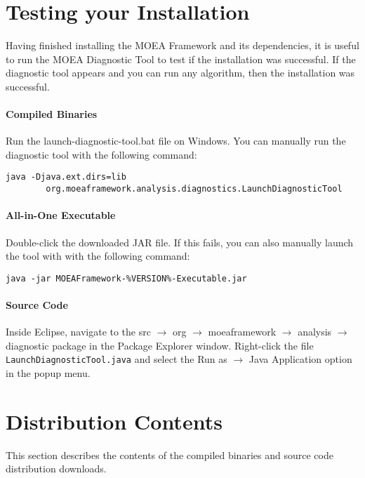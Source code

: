 \section{Testing your Installation}
Having finished installing the MOEA Framework and its dependencies, it is useful to run the MOEA Diagnostic Tool to test if the installation was successful.  If the diagnostic tool appears and you can run any algorithm, then the installation was successful.

\paragraph{Compiled Binaries}
Run the launch-diagnostic-tool.bat file on Windows.  You can manually run the diagnostic tool with the following command:

\begin{lstlisting}[language=Plaintext]
java -Djava.ext.dirs=lib
		org.moeaframework.analysis.diagnostics.LaunchDiagnosticTool
\end{lstlisting}

\paragraph{All-in-One Executable}
Double-click the downloaded JAR file.  If this fails, you can also manually launch the tool with with the following command:

\begin{lstlisting}[language=Plaintext]
java -jar MOEAFramework-%VERSION%-Executable.jar
\end{lstlisting}

\paragraph{Source Code}
Inside Eclipse, navigate to the src $\rightarrow$ org $\rightarrow$ moeaframework $\rightarrow$ analysis $\rightarrow$ diagnostic package in the Package Explorer window.  Right-click the file \texttt{LaunchDiagnosticTool.java} and select the Run as $\rightarrow$ Java Application option in the popup menu.

\section{Distribution Contents}
This section describes the contents of the compiled binaries and source code distribution downloads.

